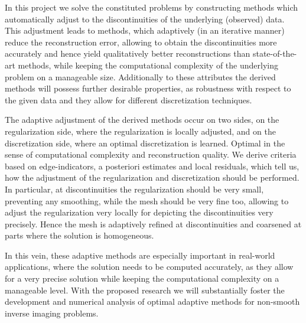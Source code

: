 \documentclass[enabledeprecatedfontcommands,cleardoublepage=empty,headsepline,twoside,11pt,DIV=15,BCOR=12mm,final]{scrartcl}
\begin{document}
In this project we solve the constituted problems by constructing methods which automatically adjust to the discontinuities of the underlying (observed) data. This adjustment leads to methods, which adaptively (in an iterative manner) reduce the reconstruction error, allowing to obtain the discontinuities more accurately and hence yield qualitatively better reconstructions than state-of-the-art methods, while keeping the computational complexity of the underlying problem on a manageable size.%
Additionally to these attributes the derived methods will possess further desirable properties, as robustness with respect to the given data %
 and they allow for different discretization techniques. 

The adaptive adjustment of the derived methods occur on two sides, on the regularization side, where the regularization is locally adjusted, and on the discretization side, where an optimal discretization is learned. Optimal in the sense of computational complexity and reconstruction quality. We derive criteria based on edge-indicators, a posteriori estimates and local residuals, which tell us, how the adjustment of the regularization and discretization should be performed. In particular, at discontinuities the regularization should be very small, preventing any smoothing, while the mesh should be very fine too, allowing to adjust the regularization very locally for depicting the discontinuities very precisely. Hence the mesh is adaptively refined at discontinuities and coarsened at parts where the solution is homogeneous.



In this vein, these adaptive methods are especially important in real-world applications, where the solution needs to be computed accurately, as they allow for a very precise solution while keeping the computational complexity on a manageable level. With the proposed research we will substantially foster the development and numerical analysis of optimal adaptive methods for non-smooth inverse imaging problems. %
\end{document}
